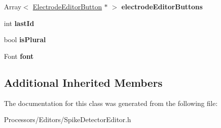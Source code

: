 \begin{DoxyCompactItemize}
\item 
\hypertarget{classSpikeDetectorEditor_a8580bea5fc10f1ee194758f88e70ad52}{Array$<$ \hyperlink{classElectrodeEditorButton}{Electrode\-Editor\-Button} $\ast$ $>$ {\bfseries electrode\-Editor\-Buttons}}\label{classSpikeDetectorEditor_a8580bea5fc10f1ee194758f88e70ad52}

\item 
\hypertarget{classSpikeDetectorEditor_add340b6f65bc5dc5ad0139e943bf54fb}{int {\bfseries last\-Id}}\label{classSpikeDetectorEditor_add340b6f65bc5dc5ad0139e943bf54fb}

\item 
\hypertarget{classSpikeDetectorEditor_a37e9442d68c7edd3db553e97edbe4016}{bool {\bfseries is\-Plural}}\label{classSpikeDetectorEditor_a37e9442d68c7edd3db553e97edbe4016}

\item 
\hypertarget{classSpikeDetectorEditor_a182bb0ac31fa20a654d0f13f058639fd}{Font {\bfseries font}}\label{classSpikeDetectorEditor_a182bb0ac31fa20a654d0f13f058639fd}

\end{DoxyCompactItemize}
\subsection*{Additional Inherited Members}


The documentation for this class was generated from the following file\-:\begin{DoxyCompactItemize}
\item 
Processors/\-Editors/Spike\-Detector\-Editor.\-h\end{DoxyCompactItemize}
